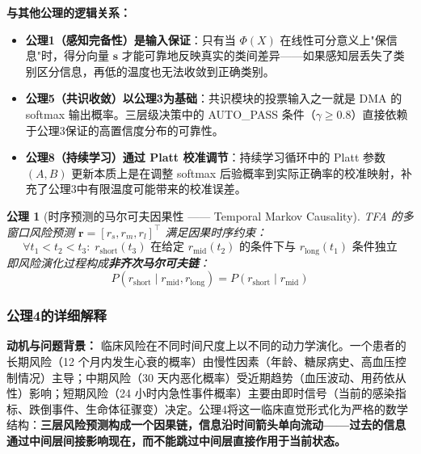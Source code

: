 \documentclass[11pt,a4paper]{ctexart}
\newtheorem{axiom}{公理}[section]
\theoremstyle{remark}
\begin{document}
\textbf{与其他公理的逻辑关系：}
\begin{itemize}[nosep]
\item \textbf{公理1（感知完备性）是输入保证}：只有当 $\Phi(X)$ 在线性可分意义上"保信息"时，得分向量 $\mathbf{s}$ 才能可靠地反映真实的类间差异——如果感知层丢失了类别区分信息，再低的温度也无法收敛到正确类别。
\item \textbf{公理5（共识收敛）以公理3为基础}：共识模块的投票输入之一就是 DMA 的 softmax 输出概率。三层级决策中的 AUTO\_PASS 条件（$\gamma \geq 0.8$）直接依赖于公理3保证的高置信度分布的可靠性。
\item \textbf{公理8（持续学习）通过 Platt 校准调节}：持续学习循环中的 Platt 参数 $(A,B)$ 更新本质上是在调整 softmax 后验概率到实际正确率的校准映射，补充了公理3中有限温度可能带来的校准误差。
\end{itemize}

\begin{axiom}[时序预测的马尔可夫因果性 —— Temporal Markov Causality]
\label{ax:temporal}
TFA 的多窗口风险预测 $\mathbf{r} = [r_s, r_m, r_l]^{\top}$ 满足因果时序约束：
\begin{equation}
\forall t_1 < t_2 < t_3:\; r_{\text{short}}(t_3) \text{ 在给定 } r_{\text{mid}}(t_2) \text{ 的条件下与 } r_{\text{long}}(t_1) \text{ 条件独立}
\end{equation}
即风险演化过程构成\textbf{非齐次马尔可夫链}：
\begin{equation}
P(r_{\text{short}} \mid r_{\text{mid}}, r_{\text{long}}) = P(r_{\text{short}} \mid r_{\text{mid}})
\end{equation}
\end{axiom}

\subsubsection{公理4的详细解释}

\textbf{动机与问题背景：} 临床风险在不同时间尺度上以不同的动力学演化。一个患者的长期风险（12 个月内发生心衰的概率）由慢性因素（年龄、糖尿病史、高血压控制情况）主导；中期风险（30 天内恶化概率）受近期趋势（血压波动、用药依从性）影响；短期风险（24 小时内急性事件概率）主要由即时信号（当前的感染指标、跌倒事件、生命体征骤变）决定。公理4将这一临床直觉形式化为严格的数学结构：\textbf{三层风险预测构成一个因果链，信息沿时间箭头单向流动——过去的信息通过中间层间接影响现在，而不能跳过中间层直接作用于当前状态。}
\end{document}
